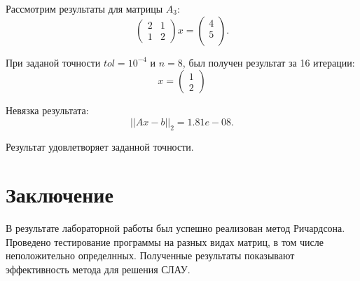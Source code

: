 \documentclass[a4paper,12pt]{article}
\begin{document}
	Рассмотрим результаты для матрицы $A_3$:
	\[
	\begin{pmatrix}
		2 & 1  \\
		1 & 2
		
	\end{pmatrix} x = 
	\begin{pmatrix}
		4\\5\\
	\end{pmatrix}.
	\]	
	
	При заданой точности $tol=10^{-4}$ и $n=8$, был получен результат за 16 итерации:
	\[
	x = 
	\begin{pmatrix}
		1 \\ 2
	\end{pmatrix}
	\]
	
	Невязка результата:
	\[
	||Ax - b||_2 = 1.81e-08.
	\]
	
	Результат удовлетворяет заданной точности.
	\newpage
	\section{Заключение}
	В результате лабораторной работы был успешно реализован метод Ричардсона. Проведено тестирование программы на разных видах матриц, в том числе неположительно определнных. Полученные результаты показывают эффективность метода для решения СЛАУ.
	\newpage
	
	
	
	
	
\end{document}
